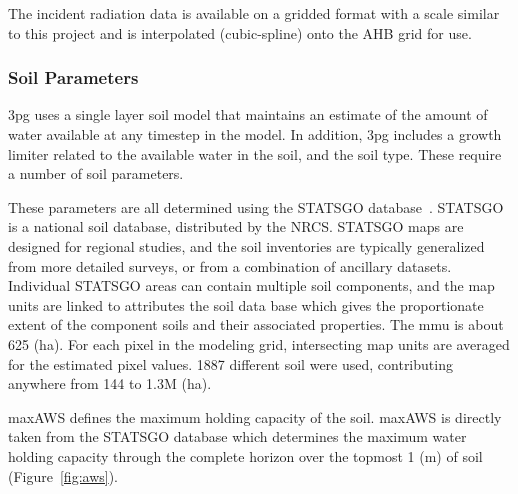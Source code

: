 \documentclass[preprint,12pt]{elsarticle}
\begin{document}
The incident radiation data is available on a gridded format with a
scale similar to this project and is interpolated (cubic-spline)
onto the \ac{AHB} grid for use.

\subsubsection{Soil Parameters}
\label{sec:soil}

\ac{3pg} uses a single layer soil model that maintains an estimate of
the amount of water available at any timestep in the model.  In
addition, \ac{3pg} includes a growth limiter related to the available
water in the soil, and the soil type.  These require a number of soil
parameters.

These parameters are all determined using the \acf{STATSGO}
database~\cite{STATSGO}.  \ac{STATSGO} is a
national soil database, distributed by the \ac{NRCS}.  \ac{STATSGO}
maps are designed for regional studies, and the soil inventories are
typically generalized from more detailed surveys, or from a
combination of ancillary datasets.  Individual \ac{STATSGO} areas can
contain multiple soil components, and the map units are linked to
attributes the soil data base which gives the proportionate extent of
the component soils and their associated properties.  The \ac{mmu} is
about 625 (ha).  For each pixel in the modeling grid, intersecting map
units are averaged for the estimated pixel values.  1887 different
soil were used, contributing anywhere from 144 to 1.3M (ha).

\ac{maxAWS} defines the maximum holding capacity of the soil.
\ac{maxAWS} is directly taken from the \ac{STATSGO} database which
determines the maximum water holding capacity through the complete
horizon over the topmost 1 (m) of soil (Figure~\ref{fig:aws}).
\end{document}
